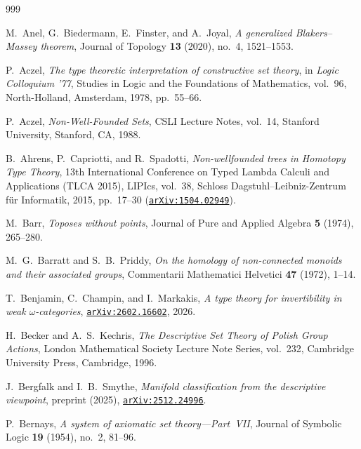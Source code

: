 \documentclass[10pt,twoside,openright]{book}
\theoremstyle{crmplain}
\theoremstyle{crmdef}
\theoremstyle{crmremark}
\begin{document}
\backmatter
\setcounter{secnumdepth}{-1}
\begin{thebibliography}{999}

M.~Anel, G.~Biedermann, E.~Finster, and A.~Joyal,
\emph{A generalized Blakers--Massey theorem},
Journal of Topology \textbf{13} (2020), no.~4, 1521--1553.

P.~Aczel,
\emph{The type theoretic interpretation of constructive set theory},
in \emph{Logic Colloquium '77}, Studies in Logic and the Foundations of Mathematics, vol.~96, North-Holland, Amsterdam, 1978, pp.~55--66.

P.~Aczel,
\emph{Non-Well-Founded Sets},
CSLI Lecture Notes, vol.~14, Stanford University, Stanford, CA, 1988.

B.~Ahrens, P.~Capriotti, and R.~Spadotti,
\emph{Non-wellfounded trees in Homotopy Type Theory},
13th International Conference on Typed Lambda Calculi and Applications (TLCA 2015), LIPIcs, vol.~38, Schloss Dagstuhl--Leibniz-Zentrum f\"ur Informatik, 2015, pp.~17--30 (\href{https://arxiv.org/abs/1504.02949}{\texttt{arXiv:1504.02949}}).

M.~Barr,
\emph{Toposes without points},
Journal of Pure and Applied Algebra \textbf{5} (1974), 265--280.

M.~G.~Barratt and S.~B.~Priddy,
\emph{On the homology of non-connected monoids and their associated groups},
Commentarii Mathematici Helvetici \textbf{47} (1972), 1--14.

T.~Benjamin, C.~Champin, and I.~Markakis,
\emph{A type theory for invertibility in weak $\omega$-categories},
\href{https://arxiv.org/abs/2602.16602}{\texttt{arXiv:2602.16602}}, 2026.

H.~Becker and A.~S.~Kechris,
\emph{The Descriptive Set Theory of Polish Group Actions},
London Mathematical Society Lecture Note Series, vol.~232, Cambridge University Press, Cambridge, 1996.

J.~Bergfalk and I.~B.~Smythe,
\emph{Manifold classification from the descriptive viewpoint},
preprint (2025), \href{https://arxiv.org/abs/2512.24996}{\texttt{arXiv:2512.24996}}.

P.~Bernays,
\emph{A system of axiomatic set theory---Part~VII},
Journal of Symbolic Logic \textbf{19} (1954), no.~2, 81--96.


\end{thebibliography}
\end{document}
